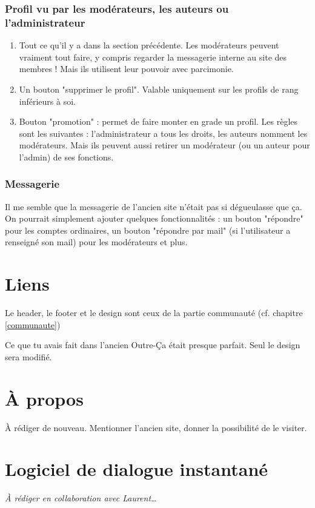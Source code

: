 \documentclass[french]{report}
\theoremstyle{plain}
\begin{document}
		\subsection{Profil vu par les modérateurs, les auteurs ou l'administrateur}
			\begin{enumerate}
				\item Tout ce qu'il y a dans la section précédente. Les modérateurs peuvent vraiment tout faire, y compris regarder la messagerie interne au site des membres ! Mais ils utilisent leur pouvoir avec parcimonie.
				\item Un bouton "supprimer le profil". Valable uniquement sur les profils de rang inférieurs à soi.
				\item Bouton "promotion" : permet de faire monter en grade un profil. Les règles sont les suivantes : l'administrateur a tous les droits, les auteurs nomment les modérateurs. Mais ils peuvent aussi retirer un modérateur (ou un auteur pour l'admin) de ses fonctions. 
			\end{enumerate}

		\subsection{Messagerie}
			Il me semble que la messagerie de l'ancien site n'était pas si dégueulasse que ça. On pourrait simplement ajouter quelques fonctionnalités : un bouton "répondre" pour les comptes ordinaires, un bouton "répondre par mail" (si l'utilisateur a renseigné son mail) pour les modérateurs et plus. 


\chapter{Liens} \label{liens}
	
	Le header, le footer et le design sont ceux de la partie communauté (cf. chapitre \ref{communaute})

	Ce que tu avais fait dans l'ancien Outre-Ça était presque parfait. Seul le design sera modifié.

\chapter{À propos} \label{a_propos}

	À rédiger de nouveau. Mentionner l'ancien site, donner la possibilité de le visiter.


\chapter{Logiciel de dialogue instantané} \label{dialogue}
	\emph{À rédiger en collaboration avec Laurent\ldots}
\end{document}
